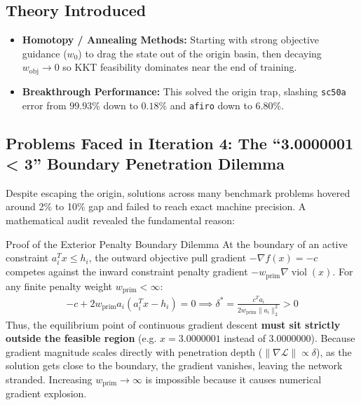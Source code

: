 \documentclass[11pt,a4paper]{article}
\begin{document}
\subsection{Theory Introduced}
\begin{itemize}[leftmargin=1.5em, itemsep=2pt]
    \item \textbf{Homotopy / Annealing Methods:} Starting with strong objective guidance ($w_0$) to drag the state out of the origin basin, then decaying $w_{\text{obj}} \to 0$ so KKT feasibility dominates near the end of training.
    \item \textbf{Breakthrough Performance:} This solved the origin trap, slashing \texttt{sc50a} error from $99.93\%$ down to \textbf{$0.18\%$} and \texttt{afiro} down to \textbf{$6.80\%$}.
\end{itemize}

\subsection{Problems Faced in Iteration 4: The ``3.0000001 < 3'' Boundary Penetration Dilemma}
Despite escaping the origin, solutions across many benchmark problems hovered around 2\% to 10\% gap and failed to reach exact machine precision. A mathematical audit revealed the fundamental reason:
\begin{discussionbox}{Proof of the Exterior Penalty Boundary Dilemma}
At the boundary of an active constraint $a_i^T x \le h_i$, the outward objective pull gradient $-\nabla f(x) = -c$ competes against the inward constraint penalty gradient $-w_{\text{prim}} \nabla \operatorname{viol}(x)$. For any finite penalty weight $w_{\text{prim}} < \infty$:
\begin{equation}
\begin{aligned}
    -c + 2 w_{\text{prim}} a_i (a_i^T x - h_i) = 0 \implies \delta^* = \frac{c^T a_i}{2 w_{\text{prim}} \|a_i\|_2^2} > 0
\end{aligned}
\end{equation}
Thus, the equilibrium point of continuous gradient descent \textbf{must sit strictly outside the feasible region} (e.g. $x = 3.0000001$ instead of $3.0000000$). Because gradient magnitude scales directly with penetration depth ($\|\nabla \mathcal{L}\| \propto \delta$), as the solution gets close to the boundary, the gradient vanishes, leaving the network stranded. Increasing $w_{\text{prim}} \to \infty$ is impossible because it causes numerical gradient explosion.
\end{discussionbox}
\end{document}
